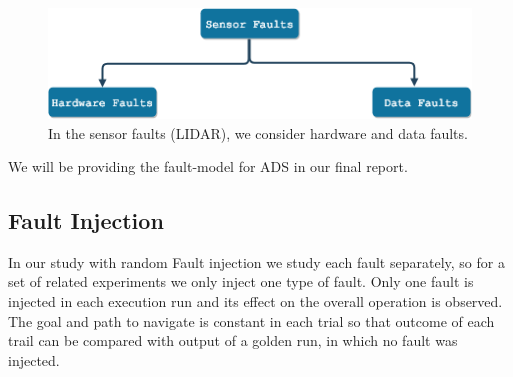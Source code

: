 \begin{figure}
 	\centering
 	\includegraphics[width=1.0\linewidth]{Sensor-faults}
 	\caption{In the sensor faults (LIDAR), we consider hardware and data faults. }
 	\label{fig:sensor-faults}
\end{figure}

 We will be providing the fault-model for ADS in our final report.
 


\subsection{Fault Injection} \label{fi_m}


In our study with random Fault injection we study each fault separately, so for a set of related experiments we only inject one type of fault. Only one fault is injected in each execution run and its effect on the overall operation is observed. The goal and path to navigate is constant in each trial so that outcome of each trail can be compared with output of a golden run, in which no fault was injected. 


